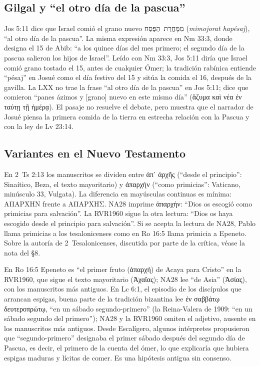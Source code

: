 \documentclass[11pt,letterpaper]{article}
\newcommand{\heb}[1]{\mbox{\foreignlanguage{hebrew}{#1}}}
\newcommand{\grc}[1]{\foreignlanguage{ancientgreek}{#1}}
\begin{document}
\subsection{Gilgal y ``el otro día de la pascua''}
Jos 5:11 dice que Israel comió el grano nuevo \heb{מִמָּחֳרַת הַפֶּסַח} (\emph{mimojorat hapésaj}), ``al otro día de la pascua''. La misma expresión aparece en Nm 33:3, donde designa el 15 de Abib: ``a los quince días del mes primero; el segundo día de la pascua salieron los hijos de Israel''. Leído con Nm 33:3, Jos 5:11 diría que Israel comió grano tostado el 15, antes de cualquier Ómer; la tradición rabínica entiende ``pésaj'' en Josué como el día festivo del 15 y sitúa la comida el 16, después de la gavilla. La LXX no trae la frase ``al otro día de la pascua'' en Jos 5:11; dice que comieron ``panes ázimos y [grano] nuevo en este mismo día'' (\grc{ἄζυμα καὶ νέα ἐν ταύτῃ τῇ ἡμέρᾳ}). El pasaje no resuelve el debate, pero muestra que el narrador de Josué piensa la primera comida de la tierra en estrecha relación con la Pascua y con la ley de Lv 23:14.

\subsection{Variantes en el Nuevo Testamento}

\begin{nota}
En 2~Ts 2:13 los manuscritos se dividen entre \grc{ἀπ᾽ ἀρχῆς} (``desde el principio'': Sinaítico, Beza, el texto mayoritario) y \grc{ἀπαρχήν} (``como primicias'': Vaticano, minúsculo 33, Vulgata). La diferencia en mayúsculas continuas es mínima: \grc{ΑΠΑΡΧΗΝ} frente a \grc{ΑΠΑΡΧΗΣ}. NA28 imprime \grc{ἀπαρχήν}: ``Dios os escogió como primicias para salvación''. La RVR1960 sigue la otra lectura: ``Dios os haya escogido desde el principio para salvación''. Si se acepta la lectura de NA28, Pablo llama primicias a los tesalonicenses como en Ro 16:5 llama primicia a Epeneto. Sobre la autoría de 2~Tesalonicenses, discutida por parte de la crítica, véase la nota del §8.
\end{nota}

\begin{nota}
En Ro 16:5 Epeneto es ``el primer fruto (\grc{ἀπαρχή}) de Acaya para Cristo'' en la RVR1960, que sigue el texto mayoritario (\grc{Ἀχαΐας}); NA28 lee ``de Asia'' (\grc{Ἀσίας}), con los manuscritos más antiguos. En Lc 6:1, el episodio de los discípulos que arrancan espigas, buena parte de la tradición bizantina lee \grc{ἐν σαββάτῳ δευτεροπρώτῳ}, ``en un sábado segundo-primero'' (la Reina-Valera de 1909: ``en un sábado segundo del primero''); NA28 y la RVR1960 omiten el adjetivo, ausente en los manuscritos más antiguos. Desde Escalígero, algunos intérpretes propusieron que ``segundo-primero'' designaba el primer sábado después del segundo día de Pascua, es decir, el primero de la cuenta del ómer, lo que explicaría que hubiera espigas maduras y lícitas de comer. Es una hipótesis antigua sin consenso.
\end{nota}
\end{document}
